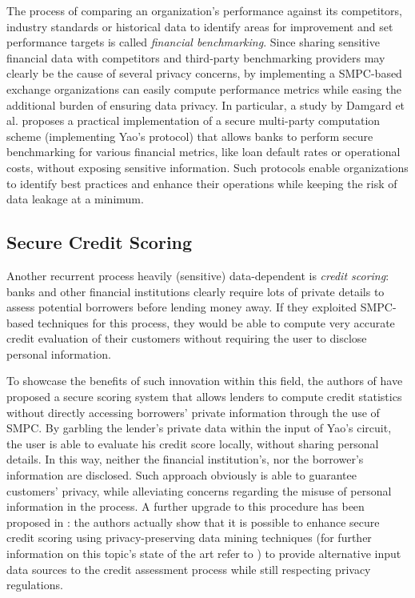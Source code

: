 \documentclass[12pt]{article}
\begin{document}
The process of comparing an organization's performance against its competitors, industry standards or historical data to identify areas for improvement and set performance targets is called \textit{financial benchmarking}. Since sharing sensitive financial data with competitors and third-party benchmarking providers may clearly be the cause of several privacy concerns, by implementing a SMPC-based exchange organizations can easily compute performance metrics while easing the additional burden of ensuring data privacy.
In particular, a study by Damgard et al. \cite{Benchmarking} proposes a practical implementation of a secure multi-party computation scheme (implementing Yao's protocol) that allows banks to perform secure benchmarking for various financial metrics, like loan default rates or operational costs, without exposing sensitive information. Such protocols enable organizations to identify best practices and enhance their operations while keeping the risk of data leakage at a minimum.

\subsection{Secure Credit Scoring}

Another recurrent process heavily (sensitive) data-dependent is \textit{credit scoring}: banks and other financial institutions clearly require lots of private details to assess potential borrowers before lending money away. If they exploited SMPC-based techniques for this process, they would be able to compute very accurate credit evaluation of their customers without requiring the user to disclose personal information.

To showcase the benefits of such innovation within this field, the authors of \cite{Scoring} have proposed a secure scoring system that allows lenders to compute credit statistics without directly accessing borrowers' private information through the use of SMPC. By garbling the lender's private data within the input of Yao's circuit, the user is able to evaluate his credit score locally, without sharing personal details. In this way, neither the financial institution's, nor the borrower's information are disclosed. Such approach obviously is able to guarantee customers' privacy, while alleviating concerns regarding the misuse of personal information in the process. A further upgrade to this procedure has been proposed in \cite{ScoringMining}: the authors actually show that it is possible to enhance secure credit scoring using privacy-preserving data mining techniques (for further information on this topic's state of the art refer to \cite{Mining}) to provide alternative input data sources to the credit assessment process while still respecting privacy regulations.
\end{document}
